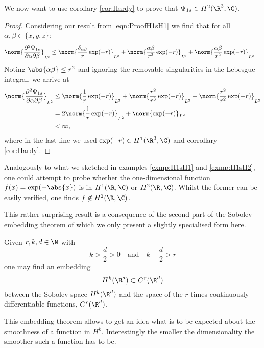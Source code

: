 \begin{exmp}
	\label{exmp:H1sH2}
	We now want to use corollary \vref{cor:Hardy} to prove that
	$\Psi_{1s} \in H^2(\R^3,\C)$.
	\begin{proof}
		Considering our result from \eqref{eqn:ProofH1sH1}
		we find that for all $\alpha, \beta \in \{x,y,z\}$:
		\begin{align*}
			\norm{\frac{\partial^2 \Psi_{1s}}{\partial \alpha \partial \beta}}_{L^2}
			&\leq \norm{ \frac{\delta_{\alpha\beta}}{r} \exp(-r)}_{L^2}
			+ \norm{\frac{\alpha\beta}{r^3}\exp(-r)}_{L^2}
			+ \norm{\frac{\alpha\beta}{r^2}\exp(-r)}_{L^2}
		\end{align*}
		Noting $\abs{\alpha\beta} \le r^2$
		and ignoring the removable singularities in the Lebesgue integral,
		we arrive at
		\begin{align*}
			\norm{\frac{\partial^2 \Psi_{1s}}{\partial \alpha \partial \beta}}_{L^2}
			&\leq \norm{\frac{1}{r} \exp(-r)}_{L^2}
			+ \norm{\frac{r^2}{r^3}\exp(-r)}_{L^2}
			+ \norm{\frac{r^2}{r^2}\exp(-r)}_{L^2} \\
			&= 2\norm{\frac{1}{r} \exp(-r)}_{L^2} + \norm{\exp(-r)}_{L^2} \\
			&< \infty,
		\end{align*}
		where in the last line we used
		$\exp(-r) \in H^1(\R^3, \C)$ and corrollary \vref{cor:Hardy}.
\end{proof}
\end{exmp}

\begin{rem}
	Analogously to what we sketched in examples \vref{exmp:H1sH1} and \vref{exmp:H1sH2},
	one could attempt to probe whether the one-dimensional function
	$f(x) = \exp(-\abs{x})$ is in $H^1(\R,\C)$ or $H^2(\R,\C)$.
	Whilst the former can be easily verified,
	one finds $f \not\in H^2(\R,\C)$.
\end{rem}

This rather surprising result is a consequence of the second part of
the Sobolev embedding theorem
of which we only present a slightly specialised form here.
\begin{thm}
	Given $r, k, d \in \N$ with
	\[ k > \frac{d}{2} > 0 \quad \text{and} \quad k -\frac{d}{2} > r \]
	one may find an embedding
	\[ H^k(\R^d) \subset C^r(\R^d) \]
	between the Sobolev space $H^k(\R^d)$ and the space of the $r$ times
	continuously differentiable functions, $C^r(\R^d)$.
\end{thm}
This embedding theorem allows to get an idea what is to be expected about
the smoothness of a function in $H^k$.
Interestingly the smaller the dimensionality the smoother such a function
has to be.

